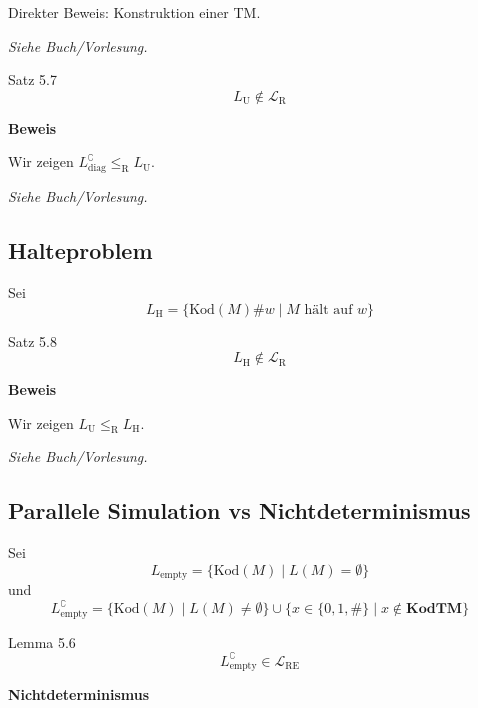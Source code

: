 \documentclass[a4paper, 11pt]{article}
\def\Lre{\mathcal{L}_\text{RE}}
\def\Lr{\mathcal{L}_\text{R}}
\newcommand\myTitle[1]{{\large \textbf {#1}}}
\begin{document}
                    Direkter Beweis: Konstruktion einer TM.
                
                    \textit{Siehe Buch/Vorlesung.}
                
                    \begin{mainbox}{Satz 5.7}
                        $$L_{\text{U}} \notin \Lr$$
                    \end{mainbox}
                    \textbf{Beweis}
                
                    Wir zeigen $L_{\text{diag}}^\complement \leq_{\text{R}} L_{\text{U}}$.
                
                    \textit{Siehe Buch/Vorlesung.}
                    \subsection{Halteproblem}
                    Sei $$L_{\text{H}} = \{\text{Kod}(M)\#w \mid M \text{ hält auf }w\}$$
                    \begin{mainbox}{Satz 5.8}
                        $$L_{\text{H}} \notin \Lr$$
                    \end{mainbox}
                    \textbf{Beweis}
                
                    Wir zeigen $L_{\text{U}} \leq_{\text{R}} L_{\text{H}}$.
                
                    \textit{Siehe Buch/Vorlesung.}
                
                
                
                
                
                    \subsection{Parallele Simulation vs Nichtdeterminismus}
                    Sei 
                    $$L_{\text{empty}} = \{\text{Kod}(M) \mid L(M) = \emptyset\}$$
                    und 
                    $$L_{\text{empty}}^\complement = \{\text{Kod}(M) \mid L(M) \neq \emptyset\} \cup \{x \in \{0,1, \#\}\mid x \notin \textbf{KodTM}\}$$
                    \begin{mainbox}{Lemma 5.6}
                        $$L_{\text{empty}}^\complement \in \Lre$$
                    \end{mainbox}
                
                
                
                    \myTitle{Nichtdeterminismus}
\end{document}
